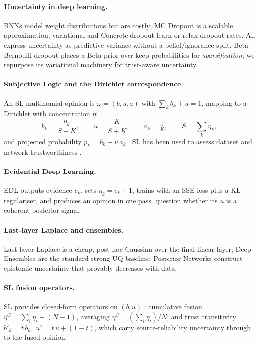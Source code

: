 \documentclass[11pt]{article}
\begin{document}
\paragraph{Uncertainty in deep learning.}
BNNs \citep{neal1996,blundell2015} model weight distributions but are costly; MC Dropout
\citep{gal2016b} is a scalable approximation; variational and Concrete dropout
\citep{molchanov2017,gal2017concrete,maddison2017} learn or relax dropout rates. All
express uncertainty as predictive variance without a belief/ignorance split.
Beta--Bernoulli dropout \citep{lee2019} places a Beta prior over keep probabilities for
\emph{sparsification}; we repurpose its variational machinery for trust-aware
uncertainty.

\paragraph{Subjective Logic and the Dirichlet correspondence.}
An SL multinomial opinion is $\omega=(b,u,a)$ with $\sum_k b_k+u=1$, mapping to a
Dirichlet with concentration $\eta$:
\begin{equation}
b_k=\frac{\eta_k}{S+K},\qquad u=\frac{K}{S+K},\qquad a_k=\tfrac1K,\qquad S=\textstyle\sum_k\eta_k,
\end{equation}
and projected probability $p_k=b_k+u\,a_k$ \citep{josang2016}. SL has been used to assess
dataset and network trustworthiness \citep{cheng2020,ouattara2025a,ouattara2025b}.

\paragraph{Evidential Deep Learning.}
EDL \citep{sensoy2018} outputs evidence $e_k$, sets $\eta_k=e_k+1$, trains with an SSE
loss plus a KL regulariser, and produces an opinion in one pass. \citet{shen2024}
question whether its $u$ is a coherent posterior signal.

\paragraph{Last-layer Laplace and ensembles.}
Last-layer Laplace \citep{daxberger2021} is a cheap, post-hoc Gaussian over the final
linear layer; Deep Ensembles \citep{lakshminarayanan2017} are the standard strong UQ
baseline; Posterior Networks \citep{charpentier2020} construct epistemic uncertainty
that provably decreases with data.

\paragraph{SL fusion operators.}
SL provides closed-form operators on $(b,u)$ \citep{josang2016}: cumulative fusion
$\eta^C=\sum_i\eta_i-(N-1)$, averaging $\eta^C=(\sum_i\eta_i)/N$, and trust transitivity
$b'_k=t\,b_k,\;u'=t\,u+(1-t)$, which carry source-reliability uncertainty through to the
fused opinion.
\end{document}
